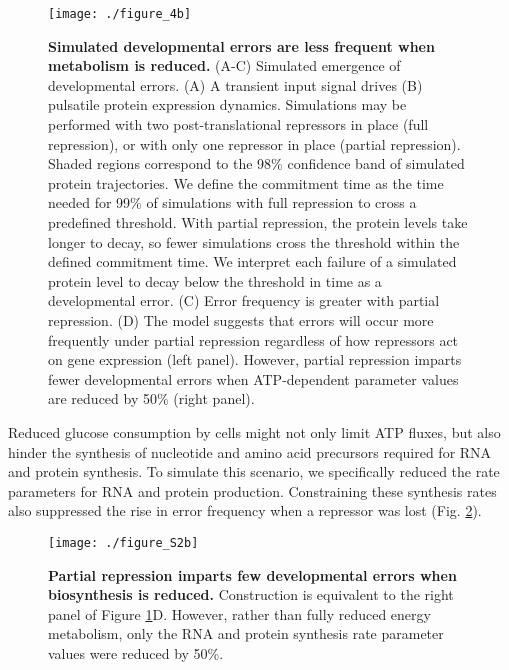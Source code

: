 \begin{figure}[h!]
\centering
\texttt{[image: ./figure\_4b]}
\caption[Simulated errors are less frequent when metabolism is reduced.]{\textbf{Simulated developmental errors are less frequent when metabolism is reduced.} (A-C) Simulated emergence of developmental errors. (A) A transient input signal drives (B) pulsatile protein expression dynamics. Simulations may be performed with two post-translational repressors in place (full repression), or with only one repressor in place (partial repression). Shaded regions correspond to the 98\% confidence band of simulated protein trajectories. We define the commitment time as the time needed for 99\% of simulations with full repression to cross a predefined threshold. With partial repression, the protein levels take longer to decay, so fewer simulations cross the threshold within the defined commitment time. We interpret each failure of a simulated protein level to decay below the threshold in time as a developmental error. (C) Error frequency is greater with partial repression. (D) The model suggests that errors will occur more frequently under partial repression regardless of how repressors act on gene expression (left panel). However, partial repression imparts fewer developmental errors when ATP-dependent parameter values are reduced by 50\% (right panel).}
\label{fig:metabolism:fig4b}
\end{figure}

Reduced glucose consumption by cells might not only limit ATP fluxes, but also hinder the synthesis of nucleotide and amino acid precursors required for RNA and protein synthesis. To simulate this scenario, we specifically reduced the rate parameters for RNA and protein production. Constraining these synthesis rates also suppressed the rise in error frequency when a repressor was lost (Fig. \ref{fig:metabolism:figS2b}).

\begin{figure}[h!]
\centering
\texttt{[image: ./figure\_S2b]}
\captionsetup{width=.65\linewidth}
\caption[Reduced biosynthesis diminishes the frequency of developmental errors.]{\textbf{Partial repression imparts few developmental errors when biosynthesis is reduced.} Construction is equivalent to the right panel of Figure \ref{fig:metabolism:fig4b}D. However, rather than fully reduced energy metabolism, only the RNA and protein synthesis rate parameter values were reduced by 50\%.}
\label{fig:metabolism:figS2b}
\end{figure}

